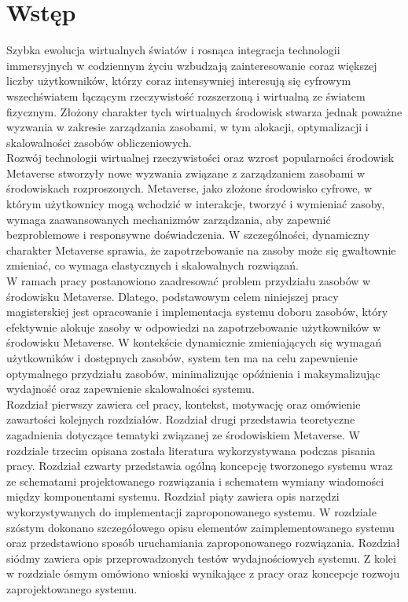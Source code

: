 \chapter{Wstęp}

Szybka ewolucja wirtualnych światów i rosnąca integracja technologii immersyjnych w codziennym życiu wzbudzają zainteresowanie coraz większej liczby użytkowników, którzy coraz intensywniej interesują się cyfrowym wszechświatem łączącym rzeczywistość rozszerzoną i wirtualną ze światem fizycznym. Złożony charakter tych wirtualnych środowisk stwarza jednak poważne wyzwania w zakresie zarządzania zasobami, w tym alokacji, optymalizacji i skalowalności zasobów obliczeniowych. \\

Rozwój technologii wirtualnej rzeczywistości oraz wzrost popularności środowisk Metaverse stworzyły nowe wyzwania związane z zarządzaniem zasobami w środowiskach rozproszonych. Metaverse, jako złożone środowisko cyfrowe, w którym użytkownicy mogą wchodzić w interakcje, tworzyć i wymieniać zasoby, wymaga zaawansowanych mechanizmów zarządzania, aby zapewnić bezproblemowe i responsywne doświadczenia. W szczególności, dynamiczny charakter Metaverse sprawia, że zapotrzebowanie na zasoby może się gwałtownie zmieniać, co wymaga elastycznych i skalowalnych rozwiązań.\\

W ramach pracy postanowiono zaadresować problem przydziału zasobów w środowisku Metaverse. Dlatego, podstawowym celem niniejszej pracy magisterskiej jest opracowanie i implementacja systemu doboru zasobów, który efektywnie alokuje zasoby w odpowiedzi na zapotrzebowanie użytkowników w środowisku Metaverse. W kontekście dynamicznie zmieniających się wymagań użytkowników i dostępnych zasobów, system ten ma na celu zapewnienie optymalnego przydziału zasobów, minimalizując opóźnienia i maksymalizując wydajność oraz zapewnienie skalowalności systemu.\\

Rozdział pierwszy zawiera cel pracy, kontekst, motywację oraz omówienie zawartości kolejnych rozdziałów. Rozdział drugi przedstawia teoretyczne zagadnienia dotyczące tematyki związanej ze środowiskiem  Metaverse. W rozdziale trzecim opisana została literatura wykorzystywana podczas pisania pracy. Rozdział czwarty przedstawia ogólną koncepcję tworzonego systemu wraz ze schematami projektowanego rozwiązania i schematem wymiany wiadomości między komponentami systemu. Rozdział piąty zawiera opis narzędzi wykorzystywanych do implementacji zaproponowanego  systemu. W rozdziale szóstym dokonano szczegółowego opisu elementów zaimplementowanego systemu oraz przedstawiono sposób uruchamiania zaproponowanego rozwiązania.  Rozdział siódmy zawiera opis przeprowadzonych testów wydajnościowych systemu. Z kolei w rozdziale ósmym omówiono wnioski wynikające z pracy oraz koncepcje rozwoju zaprojektowanego systemu.